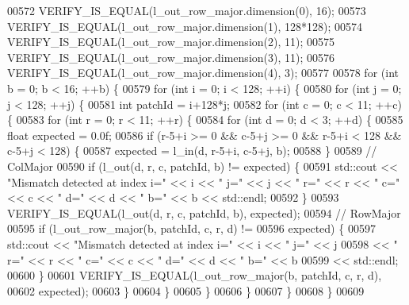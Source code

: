 \begin{DoxyCode}
00572   VERIFY\_IS\_EQUAL(l\_out\_row\_major.dimension(0), 16);
00573   VERIFY\_IS\_EQUAL(l\_out\_row\_major.dimension(1), 128*128);
00574   VERIFY\_IS\_EQUAL(l\_out\_row\_major.dimension(2), 11);
00575   VERIFY\_IS\_EQUAL(l\_out\_row\_major.dimension(3), 11);
00576   VERIFY\_IS\_EQUAL(l\_out\_row\_major.dimension(4), 3);
00577 
00578   \textcolor{keywordflow}{for} (\textcolor{keywordtype}{int} b = 0; b < 16; ++b) \{
00579     \textcolor{keywordflow}{for} (\textcolor{keywordtype}{int} i = 0; i < 128; ++i) \{
00580       \textcolor{keywordflow}{for} (\textcolor{keywordtype}{int} j = 0; j < 128; ++j) \{
00581         \textcolor{keywordtype}{int} patchId = i+128*j;
00582         \textcolor{keywordflow}{for} (\textcolor{keywordtype}{int} c = 0; c < 11; ++c) \{
00583           \textcolor{keywordflow}{for} (\textcolor{keywordtype}{int} r = 0; r < 11; ++r) \{
00584             \textcolor{keywordflow}{for} (\textcolor{keywordtype}{int} d = 0; d < 3; ++d) \{
00585               \textcolor{keywordtype}{float} expected = 0.0f;
00586               \textcolor{keywordflow}{if} (r-5+i >= 0 && c-5+j >= 0 && r-5+i < 128 && c-5+j < 128) \{
00587                 expected = l\_in(d, r-5+i, c-5+j, b);
00588               \}
00589               \textcolor{comment}{// ColMajor}
00590               \textcolor{keywordflow}{if} (l\_out(d, r, c, patchId, b) != expected) \{
00591                 std::cout << \textcolor{stringliteral}{"Mismatch detected at index i="} << i << \textcolor{stringliteral}{" j="} << j << \textcolor{stringliteral}{" r="} << r << \textcolor{stringliteral}{" c="} << c
       << \textcolor{stringliteral}{" d="} << d << \textcolor{stringliteral}{" b="} << b << std::endl;
00592               \}
00593               VERIFY\_IS\_EQUAL(l\_out(d, r, c, patchId, b), expected);
00594               \textcolor{comment}{// RowMajor}
00595               \textcolor{keywordflow}{if} (l\_out\_row\_major(b, patchId, c, r, d) !=
00596                   expected) \{
00597                 std::cout << \textcolor{stringliteral}{"Mismatch detected at index i="} << i << \textcolor{stringliteral}{" j="} << j
00598                      << \textcolor{stringliteral}{" r="} << r << \textcolor{stringliteral}{" c="} << c << \textcolor{stringliteral}{" d="} << d << \textcolor{stringliteral}{" b="} << b
00599                      << std::endl;
00600               \}
00601               VERIFY\_IS\_EQUAL(l\_out\_row\_major(b, patchId, c, r, d),
00602                               expected);
00603             \}
00604           \}
00605         \}
00606       \}
00607     \}
00608   \}
00609 

\end{DoxyCode}
